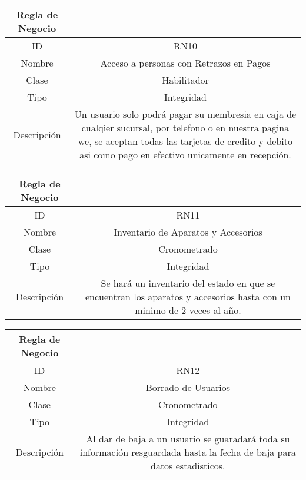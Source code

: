 \documentclass{article}
\begin{document}
\begin{center}
\begin{tabular}{ |c|c| } 
 \hline
 Regla de Negocio & \\
 \hline
 ID & RN10 \\ 
  \hline
  Nombre & Acceso a personas con Retrazos en Pagos\\ 
  \hline
  Clase & Habilitador\\ 
  \hline
  Tipo &  Integridad\\ 
  \hline
  Descripción & Un usuario solo podrá pagar su membresia en caja de cualqier sucursal, por telefono o en nuestra pagina we, se aceptan todas las tarjetas de credito y debito asi como pago en efectivo unicamente en recepción.\\ 
   \hline
 \hline
\end{tabular}
\end{center}

\begin{center}
\begin{tabular}{ |c|c| } 
 \hline
 Regla de Negocio & \\
 \hline
 ID & RN11 \\ 
  \hline
  Nombre & Inventario de Aparatos y Accesorios\\ 
  \hline
  Clase & Cronometrado\\ 
  \hline
  Tipo &  Integridad\\ 
  \hline
  Descripción & Se hará un inventario del estado en que se encuentran los aparatos y accesorios hasta con un minimo de 2 veces al año.\\ 
   \hline
 \hline
\end{tabular}
\end{center}


\begin{center}
\begin{tabular}{ |c|c| } 
 \hline
 Regla de Negocio & \\
 \hline
 ID & RN12 \\ 
  \hline
  Nombre & Borrado de Usuarios\\ 
  \hline
  Clase & Cronometrado\\ 
  \hline
  Tipo &  Integridad\\ 
  \hline
  Descripción & Al dar de baja a un usuario se guaradará toda su información resguardada hasta la fecha de baja para datos estadisticos.\\ 
   \hline
 \hline
\end{tabular}
\end{center}
\end{document}

